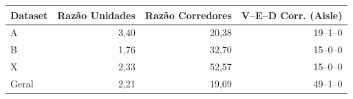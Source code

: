\small
\begin{tabular}{lrrr}
\toprule
Dataset & Razão Unidades & Razão Corredores & V--E--D Corr. (Aisle) \\
\midrule
A & 3,40 & 20,38 & 19--1--0 \\
B & 1,76 & 32,70 & 15--0--0 \\
X & 2,33 & 52,57 & 15--0--0 \\
Geral & 2,21 & 19,69 & 49--1--0 \\
\bottomrule
\end{tabular}

